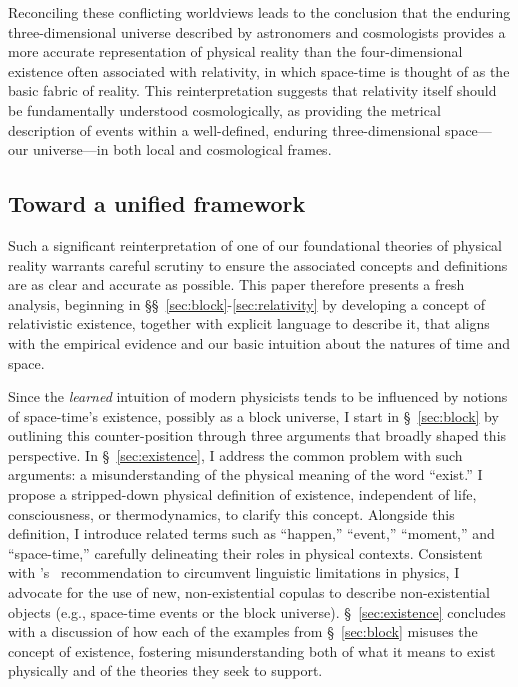 \documentclass[aps,rmp,groupedaddress,twocolumn,10pt]{revtex4-2}
\begin{document}
Reconciling these conflicting worldviews leads to the conclusion that the enduring three-dimensional universe described by astronomers and cosmologists provides a more accurate representation of physical reality than the four-dimensional existence often associated with relativity, in which space-time is thought of as the basic fabric of reality. This reinterpretation suggests that relativity itself should be fundamentally understood cosmologically, as providing the metrical description of events within a well-defined, enduring three-dimensional space---our universe---in both local and cosmological frames.

\subsection{Toward a unified framework}

Such a significant reinterpretation of one of our foundational theories of physical reality warrants careful scrutiny to ensure the associated concepts and definitions are as clear and accurate as possible. This paper therefore presents a fresh analysis, beginning in \S\S~\ref{sec:block}-\ref{sec:relativity} by developing a concept of relativistic existence, together with explicit language to describe it, that aligns with the empirical evidence and our basic intuition about the natures of time and space. 

Since the \textit{learned} intuition of modern physicists tends to be influenced by notions of space-time's existence, possibly as a block universe, I start in \S~\ref{sec:block} by outlining this counter-position through three arguments that broadly shaped this perspective. In \S~\ref{sec:existence}, I address the common problem with such arguments: a misunderstanding of the physical meaning of the word ``exist.'' I propose a stripped-down physical definition of existence, independent of life, consciousness, or thermodynamics, to clarify this concept. Alongside this definition, I introduce related terms such as ``happen,'' ``event,'' ``moment,'' and ``space-time,'' carefully delineating their roles in physical contexts. Consistent with \citeauthor{strassler2024}'s~\citeyearpar{strassler2024} recommendation to circumvent linguistic limitations in physics, I advocate for the use of new, non-existential copulas to describe non-existential objects (e.g., space-time events or the block universe). \S~\ref{sec:existence} concludes with a discussion of how each of the examples from \S~\ref{sec:block} misuses the concept of existence, fostering misunderstanding both of what it means to exist physically and of the theories they seek to support.
\end{document}
